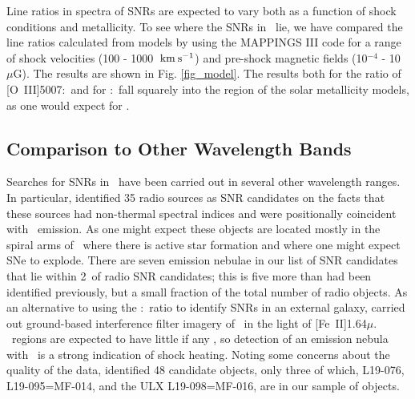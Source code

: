 
Line ratios in spectra of SNRs are expected to vary both as a function of shock conditions and metallicity.  To see where the SNRs in \gal\ lie, we have compared the line ratios calculated from models by \cite{allen08} using the MAPPINGS III code for a range of shock velocities (100 - 1000 $\:{\rm km\:s^{-1}}$) and pre-shock magnetic fields (10$^{-4}$ - 10 $\mu$G).  The results are shown in Fig. \ref{fig_model}.  The results both for the ratio of [O~III]5007:\hb\ and for \sii:\ha\ fall squarely into the region of the solar metallicity models, as one would expect for \gal.

\subsection{Comparison to Other Wavelength Bands}


Searches for SNRs in \gal\ have been carried out in several other wavelength ranges.  In particular,  \cite{lacey01} identified 35 radio sources as SNR candidates on the facts that these sources had non-thermal spectral indices and were positionally coincident with \ha\ emission.  As one might expect these objects are located mostly in the spiral arms of \gal\ where there is active star formation and where one might expect SNe to explode.  There are seven emission nebulae in our list of SNR candidates that lie within 2\arcsec\ of radio SNR candidates; this is five more than had been identified previously, but a small fraction of the total number of radio objects.  As an alternative to using the \sii:\ha\ ratio to identify SNRs in an external galaxy, \cite{bruursema14}  carried out ground-based interference filter imagery of \gal\ in the light of [Fe~II]1.64$\mu$.  \hii\ regions are expected to have little if any \feii, so detection of an emission nebula with \feii\ is a strong indication of shock heating.  Noting some concerns about the quality of the data,  \cite{bruursema14}  identified 48 candidate objects, only three of which, L19-076, L19-095=MF-014, and the ULX L19-098=MF-016, are in our sample of objects.  

